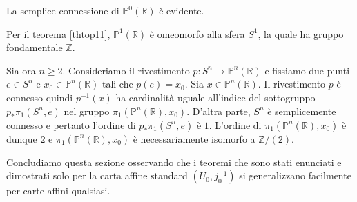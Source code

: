 \Proof La semplice connessione di $\mathbb{P}^0(\mathbb{R})$ \`e evidente.
\par Per il teorema \ref{thtop11}, $\mathbb{P}^1(\mathbb{R})$ \`e omeomorfo alla sfera $S^1$, la quale ha gruppo fondamentale $\mathbb{Z}$.
\par Sia ora $n \geq 2$. Consideriamo il rivestimento $p: S^n \rightarrow \mathbb{P}^n(\mathbb{R})$ e fissiamo due punti $e \in S^n$ e $x_0 \in \mathbb{P}^n(\mathbb{R})$ tali che $p(e) = x_0$. Sia $x \in \mathbb{P}^n(\mathbb{R})$. Il rivestimento $p$ \`e connesso quindi $p^{-1}(x)$ ha cardinalit\`a uguale all'indice del sottogruppo $p_* \pi_1(S^n, e)$ nel gruppo $\pi_1(\mathbb{P}^n(\mathbb{R}), x_0)$. D'altra parte, $S^n$ \`e semplicemente connesso e pertanto l'ordine di $p_* \pi_1(S^n, e)$ \`e $1$. L'ordine di $\pi_1(\mathbb{P}^n(\mathbb{R}), x_0)$ \`e dunque $2$ e $\pi_1(\mathbb{P}^n(\mathbb{R}), x_0)$ \`e necessariamente isomorfo a $\mathbb{Z}/(2)$. \EndProof
\par	Concludiamo questa sezione osservando che i teoremi che sono stati enunciati e dimostrati solo per la carta affine standard $(U_0,j_0^{-1})$ si generalizzano facilmente per carte affini qualsiasi.
